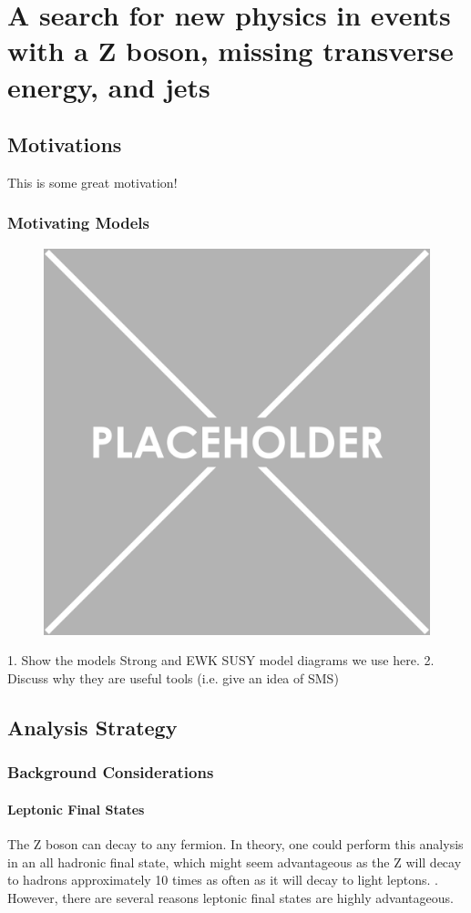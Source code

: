 \chapter{A search for new physics in events with a Z boson, missing transverse energy, and jets}

\section{Motivations}

  This is some great motivation!

  \subsection{Motivating Models} \label{sec:susy_models}

  \begin{figure}[h!]
    \centering
    \includegraphics[width=.5\textwidth]{figures/placeholder.png}
    \caption{}
    \label{fig:SUSY-diagrams}
  \end{figure}

  1. Show the models Strong and EWK SUSY model diagrams we use here.
  2. Discuss why they are useful tools (i.e. give an idea of SMS)

\section{Analysis Strategy}

  \subsection{Background Considerations}

    \subsubsection{Leptonic Final States} \label{sec:leptonic_final_states}
      The Z boson can decay to any fermion. In theory, one could perform this analysis in an all hadronic final state, which might seem advantageous as the Z will decay to hadrons approximately 10 times as often as it will decay to light leptons. . However, there are several reasons leptonic final states are highly advantageous.

